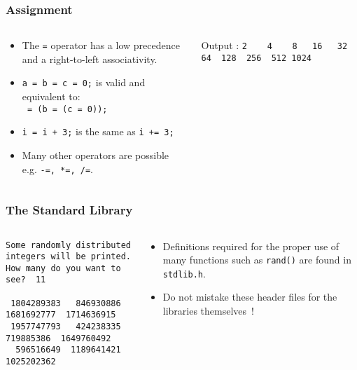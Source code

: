 \begin{frame}[fragile]
\frametitle{Assignment}

\begin{columns}
\begin{column}{0.5\textwidth}
\begin{itemize}[<+->]
\item The \verb$=$ operator has a low precedence
and a right-to-left associativity.
\item  \verb$a = b = c = 0;$ is valid and equivalent to:\\
\verb$ = (b = (c = 0));$
\item  \verb$i = i + 3;$ is the same as \verb$i += 3;$
\item  Many other operators are possible e.g. \verb$-=, *=, /=$.
\end{itemize}
\end{column}

\begin{column}{0.5\textwidth}

{\small Output : \verb^2    4    8   16   32   64  128  256  512 1024^}
\end{column}

\end{columns}
\end{frame}

\begin{frame}[fragile]
\frametitle{The Standard Library}
\begin{columns}

\begin{column}{0.65\textwidth}

\vspace*{-1em}
{\tiny
\begin{verbatim}
Some randomly distributed integers will be printed.
How many do you want to see?  11

 1804289383   846930886  1681692777  1714636915
 1957747793   424238335   719885386  1649760492
  596516649  1189641421  1025202362
\end{verbatim}
}
\end{column}

\begin{column}{0.35\textwidth}
\begin{itemize}[<+->]
\item Definitions required for the proper use of
many functions such as \verb^rand()^
are found in \verb^stdlib.h^.
\item  Do not mistake these header files for the libraries
themselves~!
\end{itemize}
\end{column}

\end{columns}
\end{frame}
